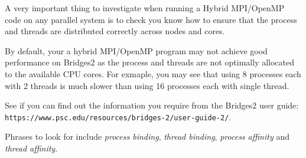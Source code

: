 \documentclass{article}
\begin{document}
A very important thing to investigate when running a Hybrid MPI/OpenMP
code on any parallel system is to check you know how to ensure that
the process and threads are distributed correctly across nodes and
cores.

By default, your a hybrid MPI/OpenMP program may not achieve good
performance on Bridges2 as the process and threads are not optimally
allocated to the available CPU cores. For exmaple, you may see that
using 8 processes each with 2 threads is much slower than using 16
processes each with single thread.

See if you can find out the information you require from the Bridges2
user guide: \\
\verb+https://www.psc.edu/resources/bridges-2/user-guide-2/+.

Phrases to look for include {\em process binding}, {\em thread
  binding}, {\em process affinity} and {\em thread affinity}.
\end{document}

